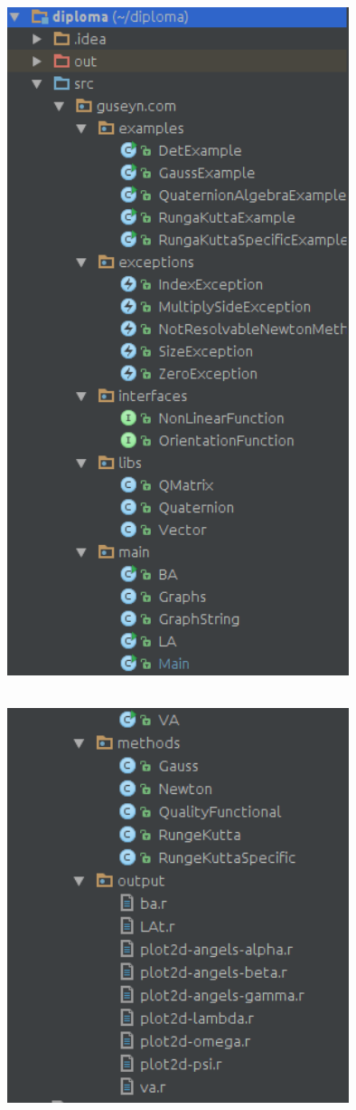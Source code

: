 \documentclass[14pt]{extreport}
\begin{document}
\begin{center}
\includegraphics[width=10cm, height=20cm]{s1.png}

\end{center}

\begin{center}
\includegraphics[width=10cm, height=12cm]{s2.png}

\end{center}
\end{document}
